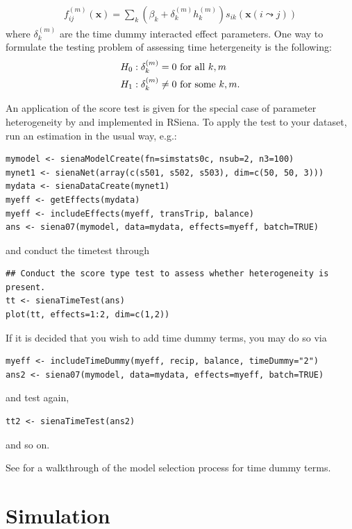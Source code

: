 \documentclass[a4paper,fleqn]{article}
\newcommand{\+}{\, + \,}
\begin{document}
{\begin{align}
f^{(m)}_{ij}(\mathbf{x})= \sum_k (\beta_k + \delta_k^{(m)} h_k^{(m)}) s_{ik}(\mathbf{x}(i \leadsto j))
\label{eq:fmij}
\end{align}
where $\delta_k^{(m)}$ are the time dummy interacted effect parameters. One way to formulate the testing problem of assessing time hetergeneity is the following:
\begin{align}
H_0:\delta_k^{(m)} = 0 & \mbox{~for all~} k,m \notag\\
H_1:\delta_k^{(m)} \neq 0 & \mbox{ for some } k,m .
\label{hyptest}
\end{align}

An application of the score test is given for the special case of parameter heterogeneity
by \citet{Lospinoso2010a} and implemented in RSiena.
To apply the test to your dataset, run an estimation in the usual way, e.g.:
\begin{verbatim}
mymodel <- sienaModelCreate(fn=simstats0c, nsub=2, n3=100)
mynet1 <- sienaNet(array(c(s501, s502, s503), dim=c(50, 50, 3)))
mydata <- sienaDataCreate(mynet1)
myeff <- getEffects(mydata)
myeff <- includeEffects(myeff, transTrip, balance)
ans <- siena07(mymodel, data=mydata, effects=myeff, batch=TRUE)
\end{verbatim}
and conduct the timetest through
\begin{verbatim}
## Conduct the score type test to assess whether heterogeneity is present.
tt <- sienaTimeTest(ans)
plot(tt, effects=1:2, dim=c(1,2))
\end{verbatim}
If it is decided that you wish to add time dummy terms, you may do so via
\begin{verbatim}
myeff <- includeTimeDummy(myeff, recip, balance, timeDummy="2")
ans2 <- siena07(mymodel, data=mydata, effects=myeff, batch=TRUE)
\end{verbatim}
and test again,
\begin{verbatim}
tt2 <- sienaTimeTest(ans2)
\end{verbatim}
and so on.

See \citet{Lospinoso2010b} for a walkthrough of the model selection process
for time dummy terms.

\begin{print}
\newpage
\end{print}
\section{Simulation}

}
\end{document}
